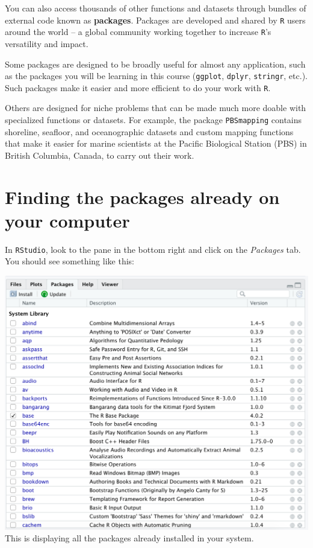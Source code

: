 \documentclass[
]{book}
\begin{document}
You can also access thousands of other functions and datasets through bundles of external code known as \textbf{packages}. Packages are developed and shared by \texttt{R} users around the world -- a global community working together to increase \texttt{R}'s versatility and impact.

Some packages are designed to be broadly useful for almost any application, such as the packages you will be learning in this course (\texttt{ggplot}, \texttt{dplyr}, \texttt{stringr}, etc.). Such packages make it easier and more efficient to do your work with \texttt{R}.

Others are designed for niche problems that can be made much more doable with specialized functions or datasets. For example, the package \texttt{PBSmapping} contains shoreline, seafloor, and oceanographic datasets and custom mapping functions that make it easier for marine scientists at the Pacific Biological Station (PBS) in British Columbia, Canada, to carry out their work.

\hypertarget{finding-the-packages-already-on-your-computer}{%
\section*{Finding the packages already on your computer}\label{finding-the-packages-already-on-your-computer}}

In \texttt{RStudio}, look to the pane in the bottom right and click on the \emph{Packages} tab. You should see something like this:

\includegraphics{img/rstudio_packages.png}
This is displaying all the packages already installed in your system.
\end{document}

